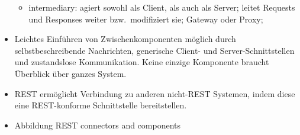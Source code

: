 \begin{itemize}
\begin{itemize}
    \item intermediary: agiert sowohl als Client, als auch als Server; leitet Requests und Responses weiter bzw.\ modifiziert sie; Gateway oder Proxy;
  \end{itemize}
  \item Leichtes Einführen von Zwischenkomponenten möglich durch selbstbeschreibende Nachrichten, generische Client- und Server-Schnittstellen und zustandslose Kommunikation. Keine einzige Komponente braucht Überblick über ganzes System.
  \item REST ermöglicht Verbindung zu anderen nicht-REST Systemen, indem diese eine REST-konforme Schnittstelle bereitstellen.
  \item Abbildung REST connectors and components
\end{itemize}